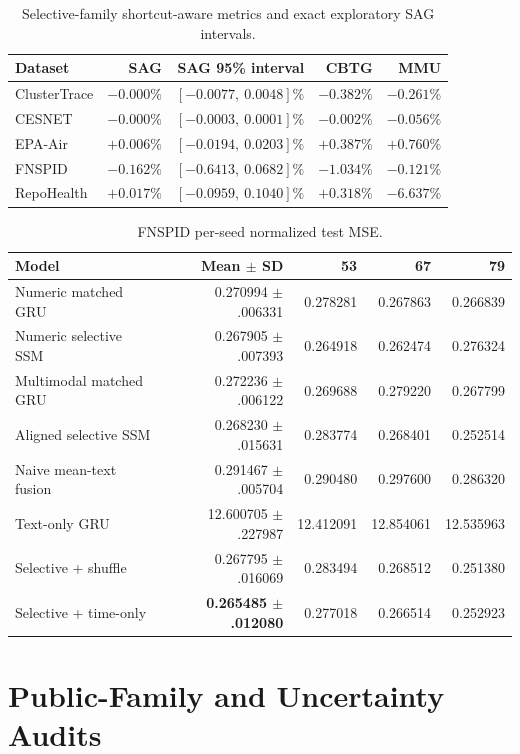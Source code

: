 \begin{table}[!htbp]
\caption{Selective-family shortcut-aware metrics and exact exploratory SAG intervals.}
\label{tab:selective-metrics}
\centering
\small
\begin{tabular}{lrrrr}
\toprule
Dataset & SAG & SAG 95\% interval & CBTG & MMU \\
\midrule
ClusterTrace & $-0.000\%$ & $[-0.0077,\ 0.0048]\%$ & $-0.382\%$ & $-0.261\%$ \\
CESNET & $-0.000\%$ & $[-0.0003,\ 0.0001]\%$ & $-0.002\%$ & $-0.056\%$ \\
EPA-Air & $+0.006\%$ & $[-0.0194,\ 0.0203]\%$ & $+0.387\%$ & $+0.760\%$ \\
FNSPID & $-0.162\%$ & $[-0.6413,\ 0.0682]\%$ & $-1.034\%$ & $-0.121\%$ \\
RepoHealth & $+0.017\%$ & $[-0.0959,\ 0.1040]\%$ & $+0.318\%$ & $-6.637\%$ \\
\bottomrule
\end{tabular}
\end{table}

\begin{table}[!htbp]
\caption{FNSPID per-seed normalized test MSE.}
\label{tab:fnspid-seeds}
\centering
\small
\begin{tabular}{lrrrr}
\toprule
Model & Mean $\pm$ SD & 53 & 67 & 79 \\
\midrule
Numeric matched GRU & 0.270994 $\pm$ .006331 & 0.278281 & 0.267863 & 0.266839 \\
Numeric selective SSM & 0.267905 $\pm$ .007393 & 0.264918 & 0.262474 & 0.276324 \\
Multimodal matched GRU & 0.272236 $\pm$ .006122 & 0.269688 & 0.279220 & 0.267799 \\
Aligned selective SSM & 0.268230 $\pm$ .015631 & 0.283774 & 0.268401 & 0.252514 \\
Naive mean-text fusion & 0.291467 $\pm$ .005704 & 0.290480 & 0.297600 & 0.286320 \\
Text-only GRU & 12.600705 $\pm$ .227987 & 12.412091 & 12.854061 & 12.535963 \\
Selective + shuffle & 0.267795 $\pm$ .016069 & 0.283494 & 0.268512 & 0.251380 \\
Selective + time-only & \textbf{0.265485 $\pm$ .012080} & 0.277018 & 0.266514 & 0.252923 \\
\bottomrule
\end{tabular}
\end{table}

\section{Public-Family and Uncertainty Audits}
\label{app:uncertainty}

